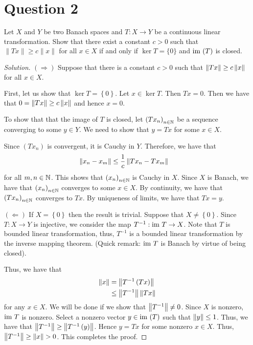 \section{Question 2}
\horz
Let $X$ and $Y$ be two Banach spaces and  $T: X \rightarrow Y$ be a continuous linear transformation. Show that there exist a constant $c>0$ such that $\|Tx\| \geqslant c \|x\|$ for all $x\in X$ if and only if $\ker T=\{0\}$ and ${\text{im }} (T)$ is closed.

\horz

\begin{proof}[Solution]
    $\left( \Longrightarrow \right)$ Suppose that there is a constant $c>0$ such that $\left\lVert Tx \right\rVert \ge c\left\lVert x \right\rVert$ for all $x\in X$. 

    First, let us show that $\ker T = \left\{ 0 \right\}$. Let $x\in \ker T$. Then $Tx=0$. Then we have that $0=\left\lVert Tx \right\rVert\ge c \left\lVert x \right\rVert$ and hence $x=0$. 

    To show that that the image of $T$ is closed, let $\left( Tx_{n} \right)_{n\in \mathbb N}$ be a sequence converging to some $y \in Y$. We need to show that $y=Tx$ for some $x\in X$. 

    Since $\left( Tx_{n} \right)$ is convergent, it is Cauchy in $Y$. Therefore, we have that 
    \begin{align*}
	\left\lVert x_{n} -x_m \right\rVert &\le \frac{1}{c} \left\lVert Tx_{n} - Tx_{m} \right\rVert
    \end{align*}
    for all $m,n \in \mathbb N$. This shows that $\left( x_{n} \right)_{n\in \mathbb N}$ is Cauchy in $X$. Since $X$ is Banach, we have that $\left( x_{n} \right)_{n\in\mathbb N}$ converges to some $x\in X$. By continuity, we have that $\left( Tx_{n} \right)_{n\in \mathbb N}$ converges to $Tx$. By uniqueness of limits, we have that $Tx=y$.

    $\left( \Longleftarrow \right)$ If $X=\left\{ 0 \right\}$ then the result is trivial. Suppose that $X \ne \left\{ 0 \right\}$. Since $T: X \to Y$ is injective, we consider the map $T^{-1} : {\text{im }} T \to X$. Note that $T$ is bounded linear transformation, thus, $T^{-1}$ is a bounded linear transformation by the inverse mapping theorem. (Quick remark: ${\text{im }} T$ is Banach by virtue of being closed).

    Thus, we have that
    \begin{align*}
	\left\lVert x \right\rVert &= \left\lVert T^{-1} \left( Tx \right) \right\rVert \\
	&\le \left\lVert T^{-1} \right\rVert \left\lVert Tx \right\rVert
    \end{align*}
    for any $x\in X$.
    We will be done if we show that $\left\lVert T^{-1} \right\rVert \ne 0$. Since $X$ is nonzero, ${\text{im }} T$ is nonzero. Select a nonzero vector $y\in {\text{im }} (T)$ such that $\left\lVert y \right\rVert \le 1$. Thus, we have that $\left\lVert T^{-1} \right\rVert \ge \left\lVert T^{-1} \left( y \right) \right\rVert$. Hence $y=Tx$ for some nonzero $x\in X$. Thus, $\left\lVert T^{-1} \right\rVert \ge \left\lVert x \right\rVert >0$. This completes the proof.
\end{proof}
